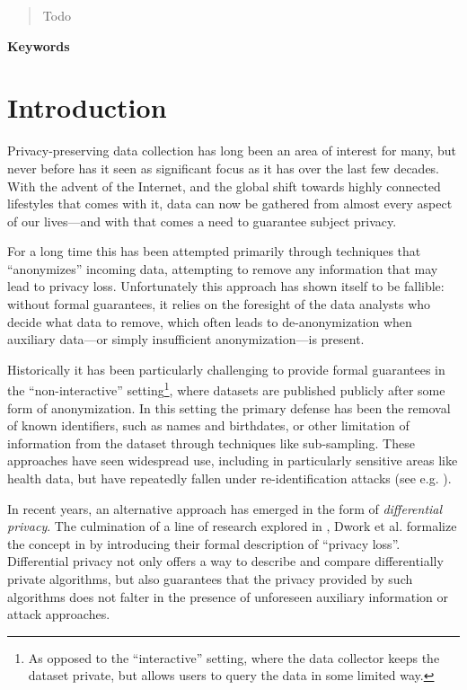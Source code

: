\documentclass[12pt]{article}
\newcommand{\todo}[1]{{\color{red}#1}}
\begin{document}


\renewcommand{\abstractname}{Abstract}
\begin{abstract}
\todo{Todo}
\end{abstract}

\begin{center} \bf Keywords \end{center}

\thispagestyle{empty}
\tableofcontents
\newpage

\section{Introduction}

Privacy-preserving data collection has long been an area of interest for many, but never before has it seen as significant focus as it has over the last few decades. With the advent of the Internet, and the global shift towards highly connected lifestyles that comes with it, data can now be gathered from almost every aspect of our lives---and with that comes a need to guarantee subject privacy.

For a long time this has been attempted primarily through techniques that ``anonymizes'' incoming data, attempting to remove any information that may lead to privacy loss. Unfortunately this approach has shown itself to be fallible: without formal guarantees, it relies on the foresight of the data analysts who decide what data to remove, which often leads to de-anonymization when auxiliary data---or simply insufficient anonymization---is present.

\bigskip

Historically it has been particularly challenging to provide formal guarantees in the ``non-interactive'' setting\footnote{As opposed to the ``interactive'' setting, where the data collector keeps the dataset private, but allows users to query the data in some limited way.}, where datasets are published publicly after some form of anonymization. In this setting the primary defense has been the removal of known identifiers, such as names and birthdates, or other limitation of information from the dataset through techniques like sub-sampling. These approaches have seen widespread use, including in particularly sensitive areas like health data, but have repeatedly fallen under re-identification attacks (see e.g. \cite{reidentification2011}).

In recent years, an alternative approach has emerged in the form of \emph{differential privacy}. The culmination of a line of research explored in \cite{precursor_2003,precursor_2004,precusor_2005}, Dwork et al. formalize the concept in \cite{dworketal2006} by introducing their formal description of ``privacy loss''. Differential privacy not only offers a way to describe and compare differentially private algorithms, but also guarantees that the privacy provided by such algorithms does not falter in the presence of unforeseen auxiliary information or attack approaches.
\end{document}
